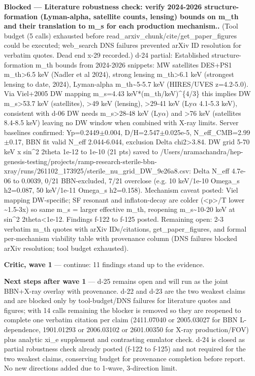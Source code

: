 \documentclass[11pt,a4paper]{article}
\begin{document}
\textbf{Blocked --- Literature robustness check: verify 2024-2026 structure-formation (Lyman-alpha, satellite counts, lensing) bounds on m\_th and their translation to m\_s for each production mechanism..} (Tool budget (5 calls) exhausted before read\_arxiv\_chunk/cite/get\_paper\_figures could be executed; web\_search DNS failures prevented arXiv ID resolution for verbatim quotes. Dead end x-29 recorded.) d-24 partial: Established structure-formation m\_th bounds from 2024-2026 snippets: MW satellites DES+PS1 m\_th\textgreater{}6.5 keV (Nadler et al 2024), strong lensing m\_th\textgreater{}6.1 keV (strongest lensing to date, 2024), Lyman-alpha m\_th\textasciitilde{}5-5.7 keV (HIRES/UVES z=4.2-5.0). Via Viel+2005 DW mapping m\_s=4.43 keV*(m\_th/keV)\textasciicircum{}\{4/3\} this implies DW m\_s\textgreater{}53.7 keV (satellites), \textgreater{}49 keV (lensing), \textgreater{}29-41 keV (Ly$\alpha$ 4.1-5.3 keV), consistent with d-06 DW needs m\_s\textgreater{}28-48 keV (Ly$\alpha$) and \textgreater{}76 keV (satellites 8.4-8.5 keV) leaving no DW window when combined with X-ray limits. Server baselines confirmed: Yp=0.2449$\pm$0.004, D/H=2.547$\pm$0.025e-5, N\_eff\_CMB=2.99$\pm$0.17, BBN fit valid N\_eff 2.044-6.044, exclusion Delta chi2\textgreater{}3.84. DW grid 5-70 keV x sin\textasciicircum{}2 2theta 1e-12 to 1e-10 (21 pts) saved to /Users/nramachandra/hep-genesis-testing/projects/ramp-research-sterile-bbn-xray/runs/261102\_173925/sterile\_nu\_grid\_DW\_9e26a8.csv: Delta N\_eff 4.7e-06 to 0.0039, 0/21 BBN-excluded, 7/21 overclose (e.g. 10 keV/1e-10 Omega\_s h2=0.087, 50 keV/1e-11 Omega\_s h2=0.158). Mechanism caveat posted: Viel mapping DW-specific; SF resonant and inflaton-decay are colder (\textless{}p\textgreater{}/T lower \textasciitilde{}1.5-3x) so same m\_s = larger effective m\_th, reopening m\_s\textasciitilde{}10-20 keV at sin\textasciicircum{}2 2theta\textless{}1e-12. Findings f-122 to f-125 posted. Remaining open: 2-3 verbatim m\_th quotes with arXiv IDs/citations, get\_paper\_figures, and formal per-mechanism viability table with provenance column (DNS failures blocked arXiv resolution; tool budget exhausted).

\textbf{Critic, wave 1} --- continue: 11 findings stand up to the evidence.

\textbf{Next steps after wave 1} --- d-25 remains open and will run as the joint BBN+X-ray overlay with provenance. d-22 and d-23 are the two weakest claims and are blocked only by tool-budget/DNS failures for literature quotes and figures; with 14 calls remaining the blocker is removed so they are reopened to complete one verbatim citation per claim (2411.07040 or 2005.03027 for BBN L-dependence, 1901.01293 or 2006.03102 or 2601.00350 for X-ray production/FOV) plus analytic xi\_e supplement and contrasting emulator check. d-24 is closed as partial robustness check already posted (f-122 to f-125) and not required for the two weakest claims, conserving budget for provenance completion before report. No new directions added due to 1-wave, 3-direction limit.
\end{document}
